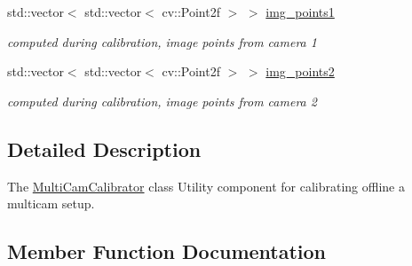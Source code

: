 \begin{DoxyCompactItemize}
\mbox{\label{classsofa_1_1rgbdtracking_1_1_multi_cam_calibrator_a194892e284e58a82692954b9eb79fb26}} 
std\+::vector$<$ std\+::vector$<$ cv\+::\+Point2f $>$ $>$ \hyperlink{classsofa_1_1rgbdtracking_1_1_multi_cam_calibrator_a194892e284e58a82692954b9eb79fb26}{img\+\_\+points1}
\begin{DoxyCompactList}\small\item\em computed during calibration, image points from camera 1 \end{DoxyCompactList}\item 
\mbox{\label{classsofa_1_1rgbdtracking_1_1_multi_cam_calibrator_a866a5fed57246db85d44a860efd805bb}} 
std\+::vector$<$ std\+::vector$<$ cv\+::\+Point2f $>$ $>$ \hyperlink{classsofa_1_1rgbdtracking_1_1_multi_cam_calibrator_a866a5fed57246db85d44a860efd805bb}{img\+\_\+points2}
\begin{DoxyCompactList}\small\item\em computed during calibration, image points from camera 2 \end{DoxyCompactList}\end{DoxyCompactItemize}


\subsection{Detailed Description}
The \hyperlink{classsofa_1_1rgbdtracking_1_1_multi_cam_calibrator}{Multi\+Cam\+Calibrator} class Utility component for calibrating offline a multicam setup. 

\subsection{Member Function Documentation}
\mbox{\label{classsofa_1_1rgbdtracking_1_1_multi_cam_calibrator_adc2012d92a9088f490ae73aff4da67a8}} 
